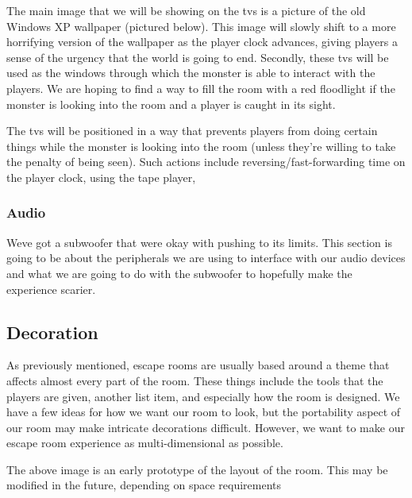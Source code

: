 \documentclass[conference]{IEEEtran}
\begin{document}
The main image that we will be showing on the tvs is a picture of the old Windows XP wallpaper (pictured below).
This image will slowly shift to a more horrifying version of the wallpaper as the player clock advances, giving
players a sense of the urgency that the world is going to end. Secondly, these tvs will be used as the windows
through which the monster is able to interact with the players. We are hoping to find a way to fill the room
with a red floodlight if the monster is looking into the room and a player is caught in its sight. %

The tvs will be positioned in a way that prevents players from doing certain things while the monster is
looking into the room (unless they're willing to take the penalty of being seen).
Such actions include reversing/fast-forwarding time on the player clock, using the tape player, %

\subsubsection*{Audio}
Weve got a subwoofer that were okay with pushing to its limits. This section is going to be about the peripherals we are using
to interface with our audio devices and what we are going to do with the subwoofer to hopefully make the experience scarier.

\subsection*{Decoration}
As previously mentioned, escape rooms are usually based around a theme that affects almost
every part of the room. These things include the tools that the players are given, another list item,
and especially how the room is designed. We have a few ideas for how we want our room to look, but
the portability aspect of our room may make intricate decorations difficult. However, we want to make
our escape room experience as multi-dimensional as possible.

The above image is an early prototype of the layout of the room. This may be modified in the future,
depending on space requirements %
\end{document}
